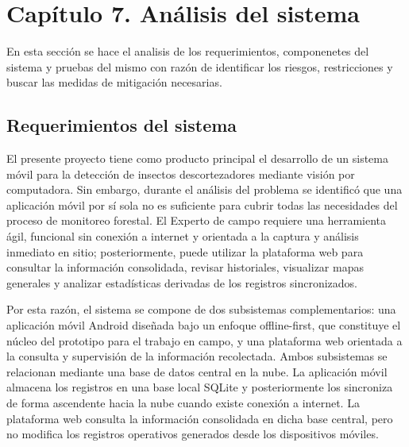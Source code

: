 \newpage
\section*{Capítulo 7. Análisis del sistema}

 En esta sección se hace el analisis de los requerimientos, componenetes del sistema y pruebas del mismo con razón de identificar los riesgos, restricciones y buscar las medidas de mitigación necesarias.

\setcounter{section}{7}
\setcounter{subsection}{0}

\subsection{Requerimientos del sistema}

El presente proyecto tiene como producto principal el desarrollo de un sistema móvil para la detección de insectos descortezadores mediante visión por computadora. Sin embargo, durante el análisis del problema se identificó que una aplicación móvil por sí sola no es suficiente para cubrir todas las necesidades del proceso de monitoreo forestal. El Experto de campo requiere una herramienta ágil, funcional sin conexión a internet y orientada a la captura y análisis inmediato en sitio; posteriormente, puede utilizar la plataforma web para consultar la información consolidada, revisar historiales, visualizar mapas generales y analizar estadísticas derivadas de los registros sincronizados.

Por esta razón, el sistema se compone de dos subsistemas complementarios: una aplicación móvil Android diseñada bajo un enfoque offline-first, que constituye el núcleo del prototipo para el trabajo en campo, y una plataforma web orientada a la consulta y supervisión de la información recolectada. Ambos subsistemas se relacionan mediante una base de datos central en la nube. La aplicación móvil almacena los registros en una base local SQLite y posteriormente los sincroniza de forma ascendente hacia la nube cuando existe conexión a internet. La plataforma web consulta la información consolidada en dicha base central, pero no modifica los registros operativos generados desde los dispositivos móviles.